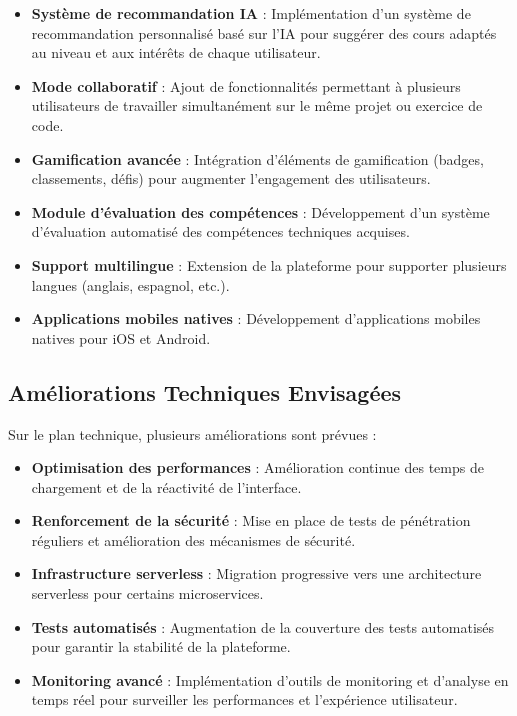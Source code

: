 \begin{itemize}
  \item \textbf{Système de recommandation IA} : Implémentation d'un système de recommandation personnalisé basé sur l'IA pour suggérer des cours adaptés au niveau et aux intérêts de chaque utilisateur.
  
  \item \textbf{Mode collaboratif} : Ajout de fonctionnalités permettant à plusieurs utilisateurs de travailler simultanément sur le même projet ou exercice de code.
  
  \item \textbf{Gamification avancée} : Intégration d'éléments de gamification (badges, classements, défis) pour augmenter l'engagement des utilisateurs.
  
  \item \textbf{Module d'évaluation des compétences} : Développement d'un système d'évaluation automatisé des compétences techniques acquises.
  
  \item \textbf{Support multilingue} : Extension de la plateforme pour supporter plusieurs langues (anglais, espagnol, etc.).
  
  \item \textbf{Applications mobiles natives} : Développement d'applications mobiles natives pour iOS et Android.
\end{itemize}

\subsection{Améliorations Techniques Envisagées}
Sur le plan technique, plusieurs améliorations sont prévues :

\begin{itemize}
  \item \textbf{Optimisation des performances} : Amélioration continue des temps de chargement et de la réactivité de l'interface.
  
  \item \textbf{Renforcement de la sécurité} : Mise en place de tests de pénétration réguliers et amélioration des mécanismes de sécurité.
  
  \item \textbf{Infrastructure serverless} : Migration progressive vers une architecture serverless pour certains microservices.
  
  \item \textbf{Tests automatisés} : Augmentation de la couverture des tests automatisés pour garantir la stabilité de la plateforme.
  
  \item \textbf{Monitoring avancé} : Implémentation d'outils de monitoring et d'analyse en temps réel pour surveiller les performances et l'expérience utilisateur.
\end{itemize}

